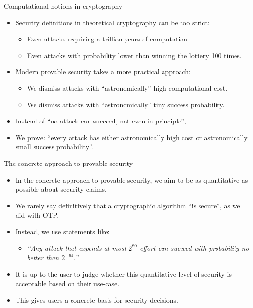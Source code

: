 \documentclass[aspectratio=169, lualatex, handout]{beamer}
\begin{document}
\begin{frame}{Computational notions in cryptography}
	\begin{itemize}
		\item Security definitions in theoretical cryptography can be too strict:
		      \begin{itemize}
			      \item Even attacks requiring a trillion years of computation.
			      \item Even attacks with probability lower than winning the lottery 100 times.
		      \end{itemize}
		\item Modern provable security takes a more practical approach:
		      \begin{itemize}
			      \item We dismiss attacks with ``astronomically'' high computational cost.
			      \item We dismiss attacks with ``astronomically'' tiny success probability.
		      \end{itemize}
		\item Instead of ``no attack can succeed, not even in principle'',
		\item We prove: ``every attack has either astronomically high cost or astronomically small success probability''.
	\end{itemize}
\end{frame}

\begin{frame}{The concrete approach to provable security}
	\begin{itemize}
		\item In the concrete approach to provable security, we aim to be as quantitative as possible about security claims.
		\item We rarely say definitively that a cryptographic algorithm ``is secure'', as we did with OTP.
		\item Instead, we use statements like:
		      \begin{itemize}
			      \item \textit{``Any attack that expends at most $2^{80}$ effort can succeed with probability no better than $2^{-64}$.''}
		      \end{itemize}
		\item It is up to the user to judge whether this quantitative level of security is acceptable based on their use-case.
		\item This gives users a concrete basis for security decisions.
	\end{itemize}
\end{frame}
\end{document}
